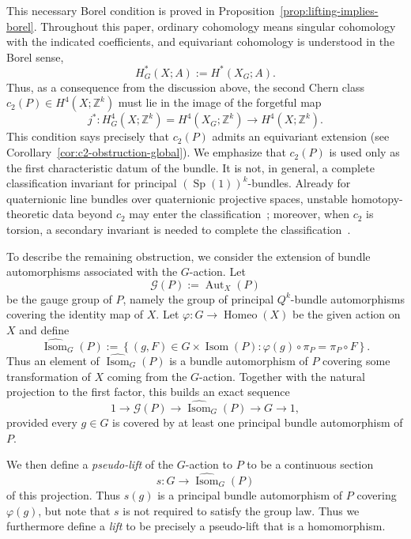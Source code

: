 \documentclass[11pt,a4paper]{article}
\numberwithin{equation}{section}
\theoremstyle{named}
\begin{document}
\noindent This necessary Borel condition is proved in Proposition~\ref{prop:lifting-implies-borel}. Throughout this paper, ordinary cohomology means singular cohomology with the indicated coefficients, and equivariant cohomology is understood in the Borel sense, \[ H^*_G(X;A):=H^*(X_G;A). \] 
Thus, as a consequence from the discussion above, the second Chern class $c_2(P)\in H^4(X;\mathbb Z^k)$ must lie in the image of the forgetful map \[ j^*:H^4_G(X;\mathbb Z^k)=H^4(X_G;\mathbb Z^k) \longrightarrow H^4(X;\mathbb Z^k). \] This condition says precisely that \(c_2(P)\) admits an equivariant extension (see Corollary~\ref{cor:c2-obstruction-global}). We emphasize that \(c_2(P)\) is used only as the first characteristic datum of the bundle. It is not, in general, a complete classification invariant for principal \((\operatorname{Sp}(1))^k\)-bundles. Already for quaternionic line bundles over quaternionic projective spaces, unstable homotopy-theoretic data beyond \(c_2\) may enter the classification~\cite{granja}; moreover, when \(c_2\) is torsion, a secondary invariant is needed to complete the classification~\cite{crowleygoette}.

To describe the remaining obstruction, we consider the extension of bundle automorphisms associated with the \(G\)-action. Let
\[
\mathcal G(P):=\operatorname{Aut}_X(P)
\]
be the gauge group of \(P\), namely the group of principal \(Q^k\)-bundle automorphisms covering the identity map of \(X\). Let  \(\varphi:G\to\operatorname{Homeo}(X)\) be the given action on \(X\) and define
\[
\widehat{\operatorname{Isom}}_G(P)
:=
\left\{
(g,F)\in G\times\operatorname{Isom}(P):
\varphi(g)\circ\pi_P=\pi_P\circ F
\right\}.
\]
Thus an element of \(\widehat{\operatorname{Isom}}_G(P)\) is a bundle automorphism of \(P\) covering some transformation of \(X\) coming from the \(G\)-action. Together with the natural projection to the first factor, this builds an exact sequence
\[
1\longrightarrow
\mathcal G(P)
\longrightarrow
\widehat{\operatorname{Isom}}_G(P)
\longrightarrow
G
\longrightarrow
1,
\]
provided every \(g\in G\) is covered by at least one principal bundle
automorphism of \(P\).

\noindent We then define a \emph{pseudo-lift} of the \(G\)-action to \(P\) to be a continuous section
\[
s:G\longrightarrow\widehat{\operatorname{Isom}}_G(P)
\]
of this projection. Thus \(s(g)\) is a principal bundle automorphism of \(P\) covering \(\varphi(g)\), but note that \(s\) is not required to satisfy the group law. Thus we furthermore define a \emph{lift} to be precisely a pseudo-lift that  is a homomorphism.
\end{document}

